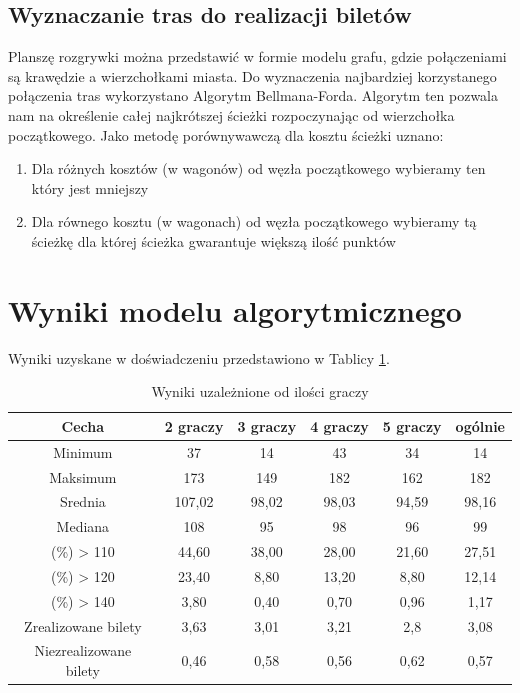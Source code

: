 \documentclass[12pt, oneside]{report}
\begin{document}
\subsection{Wyznaczanie tras do realizacji biletów}
Planszę rozgrywki można przedstawić w formie modelu grafu, gdzie połączeniami są krawędzie a wierzchołkami miasta. Do wyznaczenia najbardziej korzystanego połączenia tras wykorzystano Algorytm Bellmana-Forda. Algorytm ten pozwala nam na określenie całej najkrótszej ścieżki rozpoczynając od wierzchołka początkowego. Jako metodę porównywawczą dla kosztu ścieżki uznano:
\begin{enumerate}
	\item Dla różnych kosztów (w wagonów) od węzła początkowego wybieramy ten który jest mniejszy
	\item Dla równego kosztu (w wagonach) od węzła początkowego wybieramy tą ścieżkę dla której ścieżka gwarantuje większą ilość punktów
\end{enumerate}
\section{Wyniki modelu algorytmicznego}
Wyniki uzyskane w doświadczeniu przedstawiono w Tablicy \ref{table:algo_sizeresult}.

\begin{table}[h]
	\begin{center}
		\begin{tabular}{| c | c | c | c | c | c |} \hline
			Cecha & 2 graczy & 3 graczy & 4 graczy & 5 graczy & ogólnie \\ \hline
			Minimum & 37 & 14 & 43 & 34 & 14 \\ \hline
			Maksimum & 173 & 149 & 182 & 162 & 182 \\ \hline
			Srednia & 107,02 & 98,02 & 98,03 & 94,59 & 98,16 \\ \hline
			Mediana & 108 & 95 & 98 & 96 & 99 \\ \hline
			(\%) > 110 & 44,60 & 38,00 & 28,00 & 21,60 & 27,51 \\ \hline
			(\%) > 120 & 23,40 & 8,80 & 13,20 & 8,80 & 12,14 \\ \hline
			(\%) > 140 & 3,80 & 0,40 & 0,70 & 0,96 & 1,17 \\ \hline
			Zrealizowane bilety & 3,63 & 3,01 & 3,21 & 2,8 & 3,08 \\ \hline
			Niezrealizowane bilety & 0,46 & 0,58 & 0,56 & 0,62 & 0,57 \\ \hline
		\end{tabular}
		\caption{Wyniki uzależnione od ilości graczy}
		\label{table:algo_sizeresult}
	\end{center}
\end{table}
\end{document}
